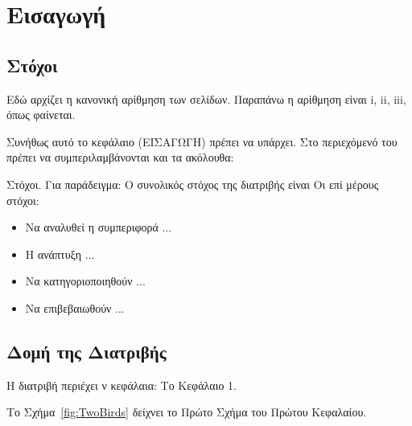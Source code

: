 \chapter{Εισαγωγή}
\label{ch:Introduction}
\minitoc

\color{red}
\section{Στόχοι}
\label{sec:Objectives}

Εδώ αρχίζει η κανονική αρίθμηση των σελίδων. Παραπάνω η αρίθμηση
είναι i, ii, iii, όπως φαίνεται.

Συνήθως αυτό το κεφάλαιο (ΕΙΣΑΓΩΓΗ) πρέπει να υπάρχει. Στο
περιεχόμενό του πρέπει να συμπεριλαμβάνονται και τα ακόλουθα:

\y Στόχοι. Για παράδειγμα: Ο συνολικός στόχος της διατριβής είναι
Οι επί μέρους στόχοι:
\begin{itemize}
\item Να αναλυθεί η συμπεριφορά ...
\item Η ανάπτυξη  ...
\item Να κατηγοριοποιηθούν  ...
\item Να επιβεβαιωθούν  ...
\end{itemize}




\section{Δομή της Διατριβής}
\label{sec:Structure}

Η διατριβή περιέχει ν κεφάλαια: Το Κεφάλαιο 1.


\newpage

\color{black}
Το Σχήμα~\ref{fig:TwoBirds} δείχνει το Πρώτο Σχήμα του Πρώτου Κεφαλαίου.

